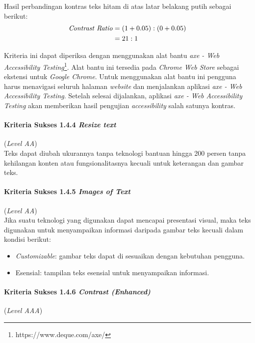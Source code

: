 Hasil perbandingan kontras teks hitam di atas latar belakang putih sebagai berikut:
\begin{align*}
\text{\textit{Contrast Ratio}} &= (1 + 0.05) : (0 + 0.05) \\
&= 21 : 1
\end{align*}

Kriteria ini dapat diperiksa dengan menggunakan alat bantu \textit{axe - Web Accessibility Testing}\footnote{https://www.deque.com/axe/}. Alat bantu ini tersedia pada \textit{Chrome Web Store} sebagai ekstensi untuk \textit{Google Chrome}. Untuk menggunakan alat bantu ini pengguna harus menavigasi seluruh halaman \textit{website} dan menjalankan aplikasi \textit{axe - Web Accessibility Testing}. Setelah selesai dijalankan, aplikasi \textit{axe - Web Accessibility Testing} akan memberikan hasil pengujian \textit{accessibility} salah satunya kontras.

\paragraph{Kriteria Sukses 1.4.4 \textit{Resize text}}
\label{subsec:kriteria_1.4.4}
(\textit{Level AA}) \\

Teks dapat diubah ukurannya tanpa teknologi bantuan hingga 200 persen tanpa kehilangan konten atau fungsionalitasnya kecuali untuk keterangan dan gambar teks.

\paragraph{Kriteria Sukses 1.4.5 \textit{Images of Text}}
\label{subsec:kriteria_1.4.5}
(\textit{Level AA}) \\

Jika suatu teknologi yang digunakan dapat mencapai presentasi visual, maka teks digunakan untuk menyampaikan informasi daripada gambar teks kecuali dalam kondisi berikut:

\begin{itemize}
	\item \textit{Customizable}: gambar teks dapat di sesuaikan dengan kebutuhan pengguna.
	\item Esensial: tampilan teks esensial untuk menyampaikan informasi.
\end{itemize}

\paragraph{Kriteria Sukses 1.4.6 \textit{Contrast (Enhanced)}}
\label{subsec:kriteria_1.4.6}
(\textit{Level AAA}) \\

